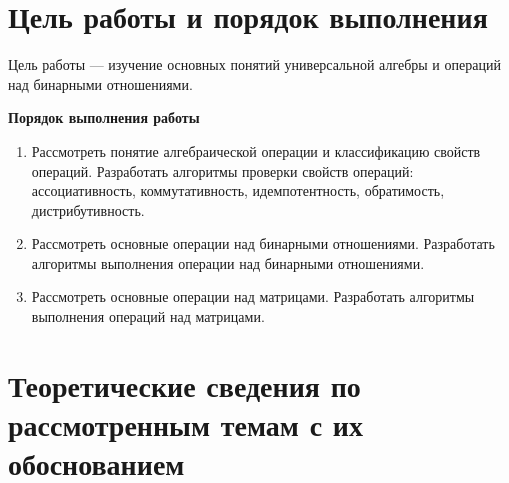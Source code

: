 \documentclass[spec, och, otchet, hidelinks]{SCWorks}
\begin{document}


\tableofcontents






\section{Цель работы и порядок выполнения}

Цель работы — изучение основных понятий универсальной алгебры и операций над бинарными отношениями.
\\

\par \textbf{Порядок выполнения работы}
\begin{enumerate}
\item Рассмотреть понятие алгебраической операции и классификацию свойств операций.
  Разработать алгоритмы проверки свойств операций: ассоциативность,
  коммутативность, идемпотентность, обратимость, дистрибутивность.
  
\item Рассмотреть основные операции над бинарными отношениями. Разработать
  алгоритмы выполнения операции над бинарными отношениями.
  
\item Рассмотреть основные операции над матрицами. Разработать алгоритмы
выполнения операций над матрицами.
\end{enumerate}

\newpage

\section{Теоретические сведения по рассмотренным темам с их обоснованием}
\end{document}
